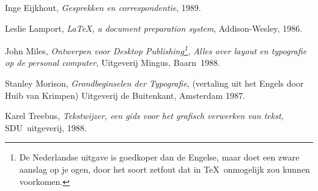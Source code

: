 \documentclass[oldtoc,a4paper,10pt]{rapport3}
\begin{document}
 
\begin{thebibliography}{9}
 
Inge Eijkhout, \emph{Gesprekken en correspondentie},
  1989.
 
Leslie Lamport, \emph{\LaTeX, a document preparation
    system}, Addison-Wesley, 1986.
 
John Miles, \emph{Ontwerpen voor Desktop
    Publishing\footnote{De Nederlandse uitgave is goedkoper dan de
      Engelse, maar doet een zware aanslag op je ogen, door het soort
      zetfout dat in \TeX\ onmogelijk zou kunnen voorkomen.}, Alles
    over layout en typografie op de personal computer}, Uitgeverij
  Mingus, Baarn~1988.
 
Stanley Morison, \emph{Grondbeginselen der
    Typografie}, (vertaling uit het Engels door Huib van Krimpen)
  Uitgeverij de Buitenkant, Amsterdam 1987.
 
Karel Treebus, \emph{Tekstwijzer, een gids voor het
    grafisch verwerken van tekst}, SDU~uitgeverij, 1988.
 
\end{thebibliography}
 
 
 
 
\end{document}
